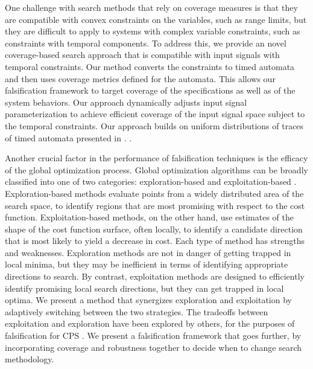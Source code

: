 One challenge with search methods that rely on coverage measures  is that they are compatible with convex constraints on the variables, such as range limits, 
but they are difficult to apply to systems with complex variable constraints, such as constraints with temporal components.
To address this, we provide an novel coverage-based search approach that is compatible with input signals with temporal constraints. Our method converts the constraints to 
timed automata and then uses coverage metrics defined for the automata.
This allows our falsification framework to target coverage of the specifications as well as of the system behaviors.
Our approach dynamically adjusts input signal parameterization to achieve
efficient coverage of the input signal space subject to
the temporal constraints. Our approach builds on uniform
distributions of traces of timed automata presented in \cite{}.
.




Another crucial factor in the performance of falsification techniques is the efficacy of the global optimization process.
Global optimization algorithms can be broadly classified into one of two
categories: exploration-based and exploitation-based \cite{Blum03}.
Exploration-based methods evaluate points from a widely distributed area 
of the search space, to identify regions that are most promising with 
respect to the cost function. Exploitation-based methods, on the other hand, 
use estimates of the shape of the cost function surface, often locally, to
identify a candidate direction that is most likely to yield a decrease
in cost.  Each type of method has strengths and weaknesses. Exploration
methods are not in danger of getting trapped in local minima, but they may 
be inefficient in terms of identifying appropriate directions to search.  By
contrast, exploitation methods are designed to efficiently identify
promising local search directions, but they can get trapped in local optima.
We present a method that synergizes exploration and 
exploitation by adaptively switching between the two strategies.
The tradeoffs between exploitation and exploration have been explored by others, 
for the purposes of falsification for CPS \cite{Ratschan14}. We present a falsification framework that goes further, by incorporating coverage and robustness together to decide when to change search methodology.

